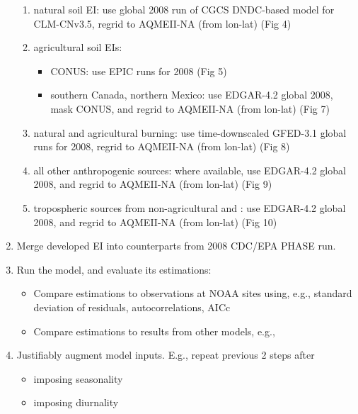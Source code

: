 \documentclass{a0poster} %
\begin{document}
\begin{textblock}{45}
\begin{enumerate}
\begin{enumerate}
            \item natural soil EI: use global 2008 run of CGCS DNDC-based model for CLM-CNv3.5, regrid to AQMEII-NA (from lon-lat) (Fig 4)
            \item agricultural soil EIs:
                \begin{itemize}
                    \item CONUS: use EPIC runs for 2008 (Fig 5)
                    \item southern Canada, northern Mexico: use EDGAR-4.2 global 2008, mask CONUS, and regrid to AQMEII-NA (from lon-lat) (Fig 7)
                \end{itemize}
            \item natural and agricultural burning: use time-downscaled GFED-3.1 global runs for 2008, regrid to AQMEII-NA (from lon-lat) (Fig 8)
            \item all other anthropogenic sources: where available, use EDGAR-4.2 global 2008, and regrid to AQMEII-NA (from lon-lat) (Fig 9)
            \item tropospheric sources from non-agricultural  and : use EDGAR-4.2 global 2008, and regrid to AQMEII-NA (from lon-lat) (Fig 10)
        \end{enumerate}
        \item Merge developed  EI into counterparts from 2008 CDC/EPA PHASE run.
        \item Run the model, and evaluate its estimations:
        \begin{itemize}
            \item Compare estimations to observations at NOAA sites using, e.g., standard deviation of residuals, autocorrelations, AICc
            \item Compare estimations to results from other models, e.g., \citet{miller_regional_2012}
        \end{itemize}
        \item Justifiably augment model inputs. E.g., repeat previous 2 steps after
        \begin{itemize}
            \item imposing seasonality 
            \item imposing diurnality
        \end{itemize}
    \end{enumerate}
\end{textblock} %
\end{document}
